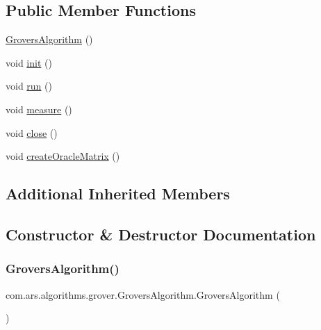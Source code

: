\subsection*{Public Member Functions}
\begin{DoxyCompactItemize}
\item 
\hyperlink{classcom_1_1ars_1_1algorithms_1_1grover_1_1_grovers_algorithm_acd86694e5d961a9e964a5dc439677738}{Grovers\+Algorithm} ()
\item 
void \hyperlink{classcom_1_1ars_1_1algorithms_1_1grover_1_1_grovers_algorithm_ae2825f36c10e6c822aef9da35992bef3}{init} ()
\item 
void \hyperlink{classcom_1_1ars_1_1algorithms_1_1grover_1_1_grovers_algorithm_a4b7b6a2e63a64325769a5ebeffb90ea9}{run} ()
\item 
void \hyperlink{classcom_1_1ars_1_1algorithms_1_1grover_1_1_grovers_algorithm_a8b5729e4882c27f2c4879bd2c7b6d17d}{measure} ()
\item 
void \hyperlink{classcom_1_1ars_1_1algorithms_1_1grover_1_1_grovers_algorithm_a0df6e611d65aed02934b95df8414fac0}{close} ()
\item 
void \hyperlink{classcom_1_1ars_1_1algorithms_1_1grover_1_1_grovers_algorithm_aaba2e3f570bd14cf35d8f81a0046075f}{create\+Oracle\+Matrix} ()
\end{DoxyCompactItemize}
\subsection*{Additional Inherited Members}


\subsection{Constructor \& Destructor Documentation}
\hypertarget{classcom_1_1ars_1_1algorithms_1_1grover_1_1_grovers_algorithm_acd86694e5d961a9e964a5dc439677738}{}\label{classcom_1_1ars_1_1algorithms_1_1grover_1_1_grovers_algorithm_acd86694e5d961a9e964a5dc439677738} 
\subsubsection{\texorpdfstring{Grovers\+Algorithm()}{GroversAlgorithm()}}
{\footnotesize\ttfamily com.\+ars.\+algorithms.\+grover.\+Grovers\+Algorithm.\+Grovers\+Algorithm (\begin{DoxyParamCaption}{ }\end{DoxyParamCaption})}

